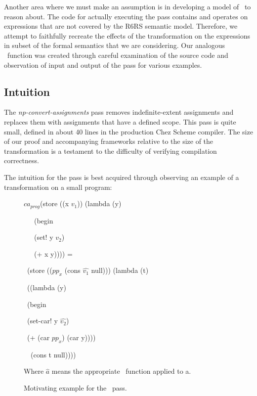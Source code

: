 Another area where we must make an assumption is in developing a model of \caname\ to reason about. The code for actually executing the pass contains and operates on expressions that are not covered by the R6RS semantic model. Therefore, we attempt to faithfully recreate the effects of the transformation on the expressions in subset of the formal semantics that we are considering. Our analogous \caname\ function was created through careful examination of the source code and observation of input and output of the pass for various examples.

\subsection{Intuition}
The \textit{np-convert-assignments} pass removes indefinite-extent assignments and replaces them with assignments that have a defined scope. This pass is quite small, defined in about 40 lines in the production Chez Scheme compiler. The size of our proof and accompanying frameworks relative to the size of the transformation is a testament to the difficulty of verifying compilation correctness.

The intuition for the pass is best acquired through observing an example of a transformation on a small program:

\begin{figure}[h]

$ca_{prog}$(store ((x $v_1$)) (lambda (y)

\qquad \qquad \ \qquad \ \qquad \quad \ (begin 

\qquad \qquad \ \qquad \ \qquad \qquad \ (set! y $v_2$) 

\qquad \qquad \ \qquad \ \qquad \qquad \ (+ x y)))) =
 
\qquad \ (store (($pp_x$ (cons $\hat{v_1}$ null))) (lambda (t)

\qquad \qquad \qquad \qquad \qquad \qquad \qquad \quad \ ((lambda (y) 

\qquad \qquad \qquad \qquad \qquad \qquad \qquad \qquad \ (begin 

\qquad \qquad \qquad \qquad \qquad \qquad \qquad \qquad \quad \ (set-car! y $\hat{v_2}$) 

\qquad \qquad \qquad \qquad \qquad \qquad \qquad \qquad \quad \  (+ (car $pp_x$) (car y)))) 

\qquad \qquad \qquad \qquad \qquad \qquad \qquad \quad \ \ (cons t null))))

Where $\hat{a}$ means the appropriate \caname\ function applied to a.
    \caption{Motivating example for the \caname \ pass.}
    \label{fig:ca_example}
\end{figure}

